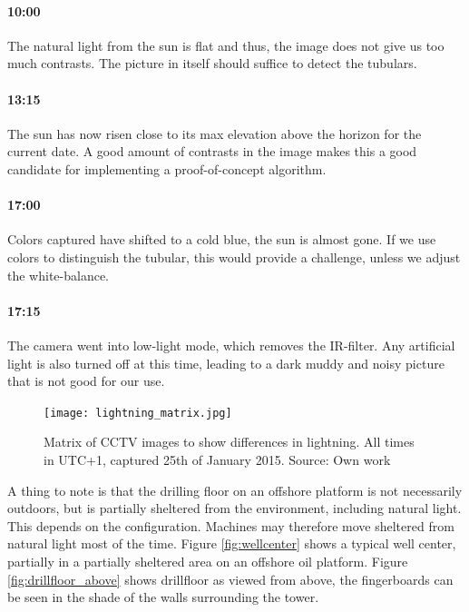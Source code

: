 \paragraph{10:00} The natural light from the sun is flat and thus, the image does not give us too much contrasts. The picture in itself should suffice to detect the tubulars.

\paragraph{13:15} The sun has now risen close to its max elevation above the horizon for the current date. A good amount of contrasts in the image makes this a good candidate for implementing a proof-of-concept algorithm.

\paragraph{17:00} Colors captured have shifted to a cold blue, the sun is almost gone. If we use colors to distinguish the tubular, this would provide a challenge, unless we adjust the white-balance.

\paragraph{17:15} The camera went into low-light mode, which removes the IR-filter. Any artificial light is also turned off at this time, leading to a dark muddy and noisy picture that is not good for our use.

\begin{figure}[ht]
    \centering
    \texttt{[image: lightning\_matrix.jpg]}
    \caption{Matrix of CCTV images to show differences in lightning. All times in UTC+1, captured 25th of January 2015. Source: Own work}
    \label{fig:lightning_matrix}
\end{figure}
\FloatBarrier

A thing to note is that the drilling floor on an offshore platform is not necessarily outdoors, but is partially sheltered from the environment, including natural light. This depends on the configuration. Machines may therefore move sheltered from natural light most of the time. Figure \ref{fig:wellcenter} shows a typical well center, partially in a partially sheltered area on an offshore oil platform. Figure \ref{fig:drillfloor_above} shows drillfloor as viewed from above, the fingerboards can be seen in the shade of the walls surrounding the tower.

